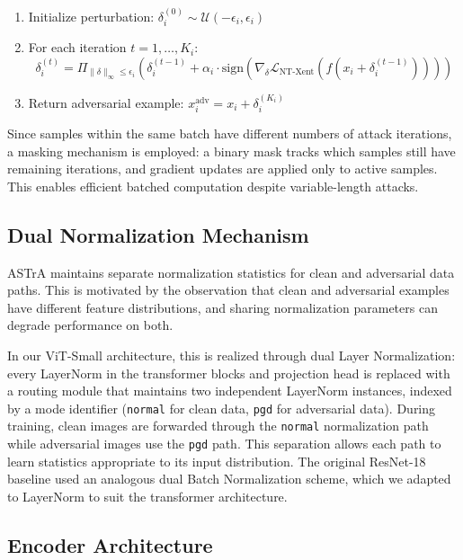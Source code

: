 \documentclass[conference]{IEEEtran}
\begin{document}
\begin{enumerate}
    \item Initialize perturbation: $\delta_i^{(0)} \sim \mathcal{U}(-\epsilon_i, \epsilon_i)$
    \item For each iteration $t = 1, \ldots, K_i$:
    \begin{equation}
    \delta_i^{(t)} = \Pi_{\|\delta\|_\infty \leq \epsilon_i} \left( \delta_i^{(t-1)} + \alpha_i \cdot \text{sign}(\nabla_\delta \mathcal{L}_{\text{NT-Xent}}(f(x_i + \delta_i^{(t-1)}))) \right)
    \end{equation}
    \item Return adversarial example: $x_i^{\text{adv}} = x_i + \delta_i^{(K_i)}$
\end{enumerate}

Since samples within the same batch have different numbers of attack iterations, a masking mechanism is employed: a binary mask tracks which samples still have remaining iterations, and gradient updates are applied only to active samples. This enables efficient batched computation despite variable-length attacks.

\subsection{Dual Normalization Mechanism}

ASTrA maintains separate normalization statistics for clean and adversarial data paths. This is motivated by the observation that clean and adversarial examples have different feature distributions, and sharing normalization parameters can degrade performance on both.

In our ViT-Small architecture, this is realized through dual Layer Normalization: every LayerNorm in the transformer blocks and projection head is replaced with a routing module that maintains two independent LayerNorm instances, indexed by a mode identifier (\texttt{normal} for clean data, \texttt{pgd} for adversarial data). During training, clean images are forwarded through the \texttt{normal} normalization path while adversarial images use the \texttt{pgd} path. This separation allows each path to learn statistics appropriate to its input distribution. The original ResNet-18 baseline used an analogous dual Batch Normalization scheme, which we adapted to LayerNorm to suit the transformer architecture.

\subsection{Encoder Architecture}
\end{document}
